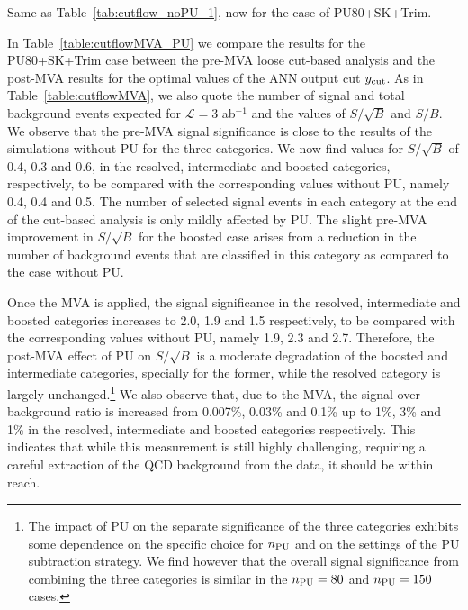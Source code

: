 \begin{table}[t]
  \centering
  \scriptsize
      
    \caption{\small Same as Table~\ref{tab:cutflow_noPU_1},
now for the case
    of PU80+SK+Trim.
 \label{tab:cutflow_PU80_1}}
\end{table}

In Table~\ref{table:cutflowMVA_PU} we compare the results
for the PU80+SK+Trim case between
  the pre-MVA loose cut-based analysis and
  the post-MVA results for the
  optimal values of the ANN output cut $y_{\rm cut}$.
  As in Table~\ref{table:cutflowMVA}, 
  we also quote 
   the number of signal and
    total background events expected
   for $\mathcal{L}=3$ ab$^{-1}$
    and the values of $S/\sqrt{B}$ and $S/B$.
%
We observe that the pre-MVA 
signal significance is close
to the results of the simulations
without PU for the three categories.
%
We now find values for $S/\sqrt{B}$ of 0.4, 0.3 and 0.6, in the resolved,
intermediate and boosted categories, respectively, to be compared
with the corresponding values without PU, namely 0.4, 0.4 and 0.5.
%
The number of selected
signal events in each category at the
end of the cut-based analysis is only mildly affected
by PU.
%
The slight pre-MVA improvement in $S/\sqrt{B}$ for the
boosted case arises from a reduction in the number
of background events that are classified in this category
as compared to the case without PU.

Once the MVA is applied, the signal significance in the 
resolved, intermediate and boosted
categories increases to 2.0, 1.9 and 1.5 respectively,
to be compared with the corresponding values
without PU, namely 1.9, 2.3 and 2.7.
%
Therefore, the post-MVA effect of PU on $S/\sqrt{B}$ is
a moderate degradation of the boosted and intermediate categories,
specially for the former,
while the resolved category is largely unchanged.\footnote{
  The impact of PU on the  separate significance of
  the three categories exhibits some
  dependence on the specific choice for $n_{\rm PU}$  and on the settings
  of the PU subtraction strategy.
  We find however that the
  overall signal significance from combining the three
  categories is similar in the $n_{\rm PU}=80$ and
  $n_{\rm PU}=150$ cases.
}
%
We also observe that, due
to the MVA, the
signal over background ratio is increased from 0.007\%, 0.03\% and
0.1\% up to 1\%, 3\% and 1\% in the resolved, intermediate
and boosted categories respectively.
%
This indicates that while this measurement is still highly challenging,
requiring a careful extraction of the QCD
background from the data, it should be within reach.

